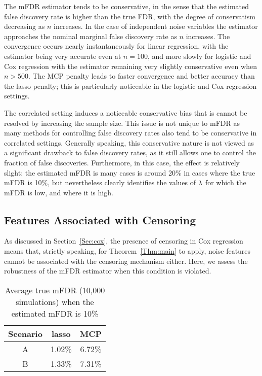 The mFDR estimator tends to be conservative, in the sense that the estimated false discovery rate is higher than the true FDR, with the degree of conservatism decreasing as $n$ increases. In the case of independent noise variables the estimator approaches the nominal marginal false discovery rate as $n$ increases. The convergence occurs nearly instantaneously for linear regression, with the estimator being very accurate even at $n=100$, and more slowly for logistic and Cox regression with the estimator remaining very slightly conservative even when $n > 500$. The MCP penalty leads to faster convergence and better accuracy than the lasso penalty; this is particularly noticeable in the logistic and Cox regression settings.


The correlated setting induces a noticeable conservative bias that is cannot be resolved by increasing the sample size. This issue is not unique to mFDR as many methods for controlling false discovery rates also tend to be conservative in correlated settings.  Generally speaking, this conservative nature is not viewed as a significant drawback to false discovery rates, as it still allows one to control the fraction of false discoveries.  Furthermore, in this case, the effect is relatively slight: the estimated mFDR is many cases is around 20\% in cases where the true mFDR is 10\%, but nevertheless clearly identifies the values of $\lambda$ for which the mFDR is low, and where it is high.

\subsection{Features Associated with Censoring}

As discussed in Section~\ref{Sec:cox}, the presence of censoring in Cox regression means that, strictly speaking, for Theorem~\ref{Thm:main} to apply, noise features cannot be associated with the censoring mechanism either.  Here, we assess the robustness of the mFDR estimator when this condition is violated.

\begin{table}[b!]
 \caption{Average true mFDR (10,000 simulations) when the estimated mFDR is 10\%}
\centering
\begin{tabular}{c | c c}
  \hline
 Scenario & lasso & MCP   \\  [0.5ex]
  \hline 
   A & 1.02\% & 6.72\% \\ 
   B &  1.33\% & 7.31\% \\ 
   \hline
\end{tabular}
\end{table}

